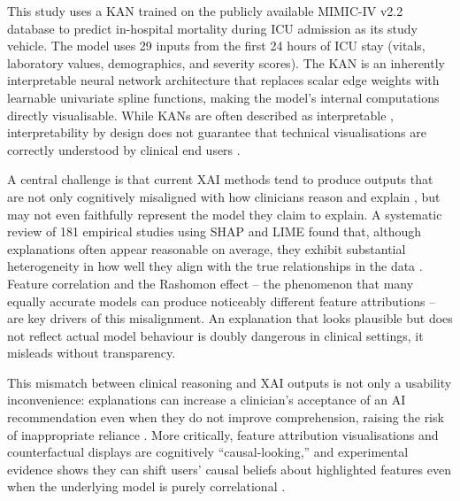 \documentclass[12pt, a4paper]{article}
\begin{document}
This study uses a KAN trained on the publicly available MIMIC-IV v2.2
database \citep{johnson2023mimic} to predict in-hospital mortality
during ICU admission as its study vehicle. The model uses 29 inputs from
the first 24 hours of ICU stay (vitals, laboratory values, demographics,
and severity scores). The KAN \citep{liu2024kan} is an inherently
interpretable neural network architecture that replaces scalar edge weights
with learnable univariate spline functions, making the model's internal
computations directly visualisable. While KANs are often described as
interpretable \citep{liu2024kan}, interpretability by design does not
guarantee that technical visualisations are correctly understood by clinical
end users \citep{rudin2019stop, ghassemi2021false}.

A central challenge is that current XAI methods tend to produce outputs
that are not only cognitively misaligned with how clinicians reason and
explain \citep{miller2019explanation, liao2020questioning}, but may not
even faithfully represent the model they claim to explain.
A systematic review of 181 empirical studies using SHAP and LIME found
that, although explanations often appear reasonable on average, they
exhibit substantial heterogeneity in how well they align with the true
relationships in the data \citep{bertrand2024posthoc}. Feature correlation and the Rashomon
effect -- the phenomenon that many equally accurate models can produce
noticeably different feature attributions -- are key drivers of this
misalignment. An explanation that looks plausible but does not reflect
actual model behaviour is doubly dangerous in clinical settings, it
misleads without transparency. 

This mismatch between clinical reasoning and XAI outputs is not only a usability inconvenience:
explanations can increase a clinician's acceptance of an AI recommendation
even when they do not improve comprehension, raising the risk of
inappropriate reliance \citep{bansal2021does, bucinca2021trust,
he2025conversational}. More critically, feature attribution visualisations
and counterfactual displays are cognitively ``causal-looking,'' and
experimental evidence shows they can shift users' causal beliefs about
highlighted features even when the underlying model is purely correlational
\citep{wachter2017counterfactual, karimi2021algorithmic,
tesic2022counterfactual}.
\end{document}
